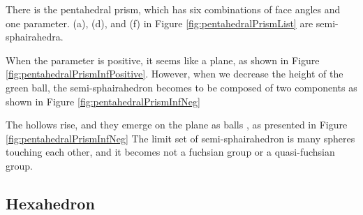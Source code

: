 \documentclass[suppldata, dvipdfmx]{interact}
\theoremstyle{plain}%
\theoremstyle{definition}
\theoremstyle{remark}
\theoremstyle{problemstyle}
\begin{document}
There is the pentahedral prism, which has six combinations of face angles
and one parameter.
(a), (d), and (f) in Figure \ref{fig:pentahedralPrismList} are
semi-sphairahedra.

When the parameter is positive, it seems like a plane, as shown in 
Figure \ref{fig:pentahedralPrismInfPositive}.
 However, when we decrease the height of the green ball, the
 semi-sphairahedron
 becomes to be composed of two components as shown in Figure \ref{fig:pentahedralPrismInfNeg}

The hollows rise, and they emerge on the plane as balls
, as presented in Figure \ref{fig:pentahedralPrismInfNeg}
The limit set of semi-sphairahedron is many spheres touching each other, and
it becomes not a fuchsian group or a quasi-fuchsian group.

\subsection{Hexahedron}
\end{document}
